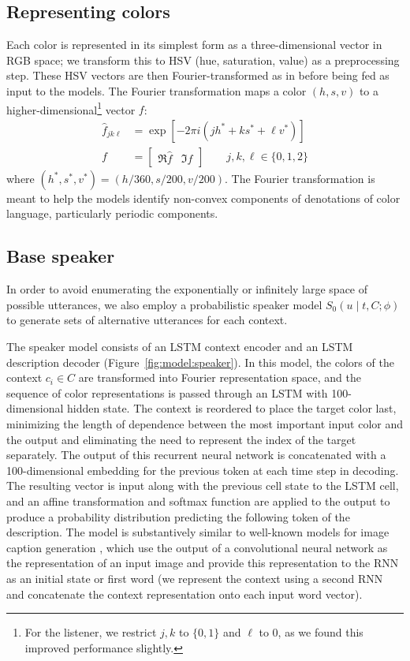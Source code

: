 \documentclass[11pt,letterpaper]{article}
\newcommand{\Speaker}{S}
\newcommand{\utt}{u}
\newcommand{\referent}{c}
\newcommand{\context}{C}
\newcommand{\target}{t}
\newcommand{\feat}{f}
\renewcommand{\|}{\mid}
\newcommand{\figref}[1]{Figure~\ref{#1}}
\begin{document}
\subsection{Representing colors} \label{sec:color_repr}

Each color is represented in its simplest form as a three-dimensional vector in
RGB space; we transform this to HSV (hue, saturation,
value) as a preprocessing step. These HSV vectors are then Fourier-transformed as in  before being fed as input to the models.
The Fourier transformation maps a color
$(h, s, v)$ to a higher-dimensional\footnote{For the listener, we restrict $j,k$ to $\{0, 1\}$ and $\ell$ to 0, as we
found this improved performance slightly.} vector $\feat$:
\begin{align*}
\hat{\feat}_{jk\ell} &= \exp \left[-2\pi i \left(jh^* + ks^* + \ell v^*\right)\right] \\
\feat &= \begin{bmatrix}
  \Re{\hat{\feat}} & \Im{\hat{\feat}}
\end{bmatrix}\qquad j,k,\ell \in \{0,1,2\}
\end{align*}
where $(h^*, s^*, v^*) = (h / 360, s / 200, v/200)$.
The Fourier transformation is meant to help the models identify non-convex components
of denotations of color language, particularly periodic components.

\subsection{Base speaker}\label{sec:s0}

In order to avoid enumerating the exponentially or infinitely large space of possible utterances,
we also employ a probabilistic speaker model
$\Speaker_0(\utt \| \target, \context; \phi)$ to generate sets of alternative
utterances for each context.

The speaker model consists of an LSTM context encoder
and an LSTM description decoder (\figref{fig:model:speaker}). In this model, the colors of the context
$\referent_i \in \context$ are transformed into Fourier representation space,
and the sequence of color representations is passed through an LSTM with
100-dimensional hidden state. The context is reordered to place the target color
last, minimizing the length of dependence between the most important input color
and the output \cite{Sutskever2014} and eliminating the need to represent the
index of the target separately.
The output of this recurrent neural network is concatenated with a
100-dimensional embedding for the previous token at each time step in decoding.
The resulting vector is input along with the previous cell state to the LSTM cell,
and an affine transformation and softmax function are applied to the output to
produce a probability distribution predicting the following token of the description.
The model is substantively similar to well-known models for image caption generation
\cite{Karpathy2015,Vinyals2015}, which use the output of a convolutional neural
network as the representation of an input image and provide this representation
to the RNN as an initial state or first word (we represent the context using
a second RNN and concatenate the context representation onto each input word vector).
\end{document}
